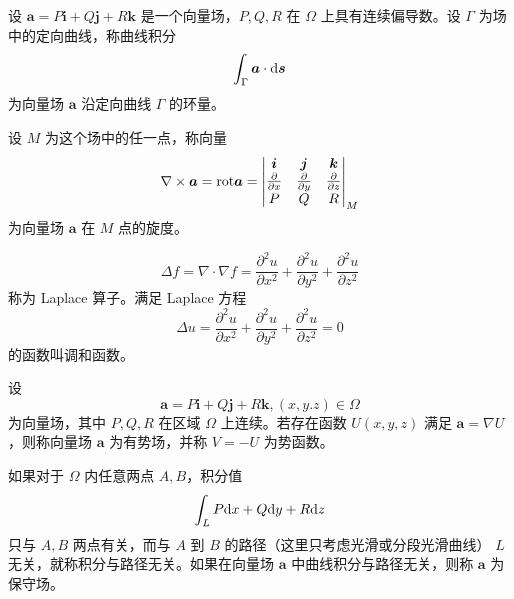 \documentclass{ctexbook}
\def\diff{\textnormal{d}}
\begin{document}
\begin{definition}[旋度]
    设 $\boldsymbol{a}=P\boldsymbol{i}+Q\boldsymbol{j}+R\boldsymbol{k}$ 是一个向量场，$P,Q,R$ 在 $\Omega$ 上具有连续偏导数。设 $\Gamma$ 为场中的定向曲线，称曲线积分
    \begin{equation}
        \int_\Gamma\boldsymbol{a}\cdot\diff\boldsymbol{s}
    \end{equation}
    为向量场 $\boldsymbol{a}$ 沿定向曲线 $\Gamma$ 的环量。
    
    设 $M$ 为这个场中的任一点，称向量
    \begin{equation}
        \nabla\times\boldsymbol{a}=\textnormal{rot}\boldsymbol{a}=\left|\begin{matrix}\boldsymbol{i}&\boldsymbol{j}&\boldsymbol{k}\\\frac{\partial}{\partial x}&\frac{\partial}{\partial y}&\frac{\partial}{\partial z}\\P&Q&R\end{matrix}\right|_M
    \end{equation}
    为向量场 $\boldsymbol{a}$ 在 $M$ 点的旋度。
\end{definition}

\begin{definition}[Laplace 算子]
    \begin{equation}
        \Delta f=\nabla\cdot\nabla f=\frac{\partial^2 u}{\partial x^2}+\frac{\partial^2 u}{\partial y^2}+\frac{\partial^2 u}{\partial z^2}
    \end{equation}
    称为 Laplace 算子。满足 Laplace 方程
    \begin{equation}
        \Delta u = \frac{\partial^2 u}{\partial x^2}+\frac{\partial^2 u}{\partial y^2}+\frac{\partial^2 u}{\partial z^2} = 0
    \end{equation}
    的函数叫调和函数。
\end{definition}

\begin{definition}[有势场]
    设
    \begin{equation}
        \boldsymbol{a}=P\boldsymbol{i}+Q\boldsymbol{j}+R\boldsymbol{k}, (x,y.z)\in\Omega
    \end{equation}
    为向量场，其中 $P, Q, R$ 在区域 $\Omega$ 上连续。若存在函数 $U(x,y,z)$ 满足 $\boldsymbol{a}=\nabla U$，则称向量场 $\boldsymbol{a}$ 为有势场，并称 $V=-U$ 为势函数。
\end{definition}

\begin{definition}[保守场]
    如果对于 $\Omega$ 内任意两点 $A,B$，积分值
    \begin{equation}
        \int_L P\diff x+Q\diff y+R\diff z
    \end{equation}
    只与 $A,B$ 两点有关，而与 $A$ 到 $B$ 的路径（这里只考虑光滑或分段光滑曲线） $L$ 无关，就称积分与路径无关。如果在向量场 $\boldsymbol{a}$ 中曲线积分与路径无关，则称 $\boldsymbol{a}$ 为保守场。
\end{definition}
\end{document}

